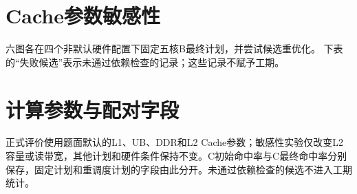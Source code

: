 \section{Cache参数敏感性}\label{app:sensitivity}
六图各在四个非默认硬件配置下固定五核B最终计划，并尝试候选重优化。
下表的“失败候选”表示未通过依赖检查的记录；这些记录不赋予工期。
\begingroup
\small
\setlength{\tabcolsep}{4.5pt}
\renewcommand{\arraystretch}{0.94}
\setlength{\LTleft}{\fill}\setlength{\LTright}{\fill}

\endgroup

\section{计算参数与配对字段}
正式评价使用题面默认的L1、UB、DDR和L2 Cache参数；敏感性实验仅改变L2容量或读带宽，其他计划和硬件条件保持不变。C初始命中率与C最终命中率分别保存，固定计划和重调度计划的字段由此分开。未通过依赖检查的候选不进入工期统计。
